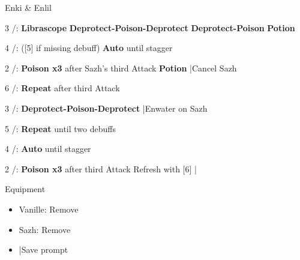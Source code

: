 \begin{fight}{Enki \& Enlil}
	\item [3] \sab/\syn: \textbf{Librascope} \to \textbf{Deprotect-Poison-Deprotect} \to \textbf{Deprotect-Poison} \to \textbf{Potion}
	\item [4] \rav/\rav: ([5] if missing debuff) \textbf{Auto} until stagger
	\item [2] \sab/\com: \textbf{Poison x3} after Sazh's third Attack \to \textbf{\textbf{Potion}} |Cancel Sazh
	\item [6] \sab/\com: \textbf{Repeat} after third Attack
	\item [3] \sab/\syn: \textbf{Deprotect-Poison-Deprotect} |Enwater on Sazh
	\item [5] \sab/\rav: \textbf{Repeat} until two debuffs
	\item [4] \rav/\rav: \textbf{Auto} until stagger
	\item [2] \sab/\com: \textbf{Poison x3} after third Attack \to Refresh with [6] |\skip
\end{fight}
\begin{menu}
	\item Equipment
	\begin{itemize}
		\item Vanille: Remove
		\item Sazh: Remove
	\end{itemize}
\end{menu}
\begin{itemize}
	\item \skip|Save prompt
\end{itemize}

